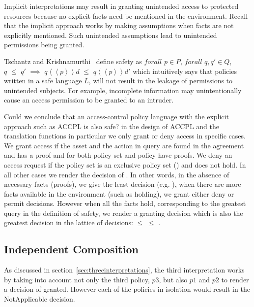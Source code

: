 Implicit interpretations may result in granting unintended access to protected resources because no explicit facts need be mentioned in the environment. Recall that the implicit approach works by making assumptions when facts are not explicitly mentioned. Such unintended assumptions lead to unintended permissions being granted.

Tschantz and Krishnamurthi~\cite{Tschantz} define safety as $forall$ $p \in P$, $forall$ $q, q' \in Q$, \\$q$ $\leq$ $q'$ $\implies$ $q \left\langle\left\langle p  \right\rangle\right\rangle d$ $\leq$ $q \left\langle\left\langle p  \right\rangle\right\rangle d'$ which intuitively says that policies written in a safe language $L$, will not result in the leakage of permissions to unintended subjects. For example, incomplete information may unintentionally cause an access permission to be granted to an intruder. 

Could we conclude that an access-control policy language with the explicit approach such as \ac{ACCPL} is also safe? in the design of \ac{ACCPL} and the translation functions in particular we only grant or deny access in specific cases. We grant access if the asset and the action in query are found in the agreement and  has a proof and  for both policy set and policy have proofs. We deny an access request if the policy set is an exclusive policy set () and  does not hold. In all other cases we render the decision of . In other words, in the absence of necessary facts (proofs), we give the least decision (e.g. ), when there are more facts available in the environment (such as  holding), we grant either deny or permit decisions. However when all the facts hold, corresponding to the greatest query in the definition of safety, we render a granting decision which is also the greatest decision in the lattice of decisions:  $\leq$  $\leq$ .


\subsection{Independent Composition}

As discussed in section~\ref{sec:threeinterpretations}, the third interpretation works by taking into account not only the third policy, $p3$, but also $p1$ and $p2$ to render a decision of granted. However each of the policies in isolation would result in the NotApplicable decision. 

